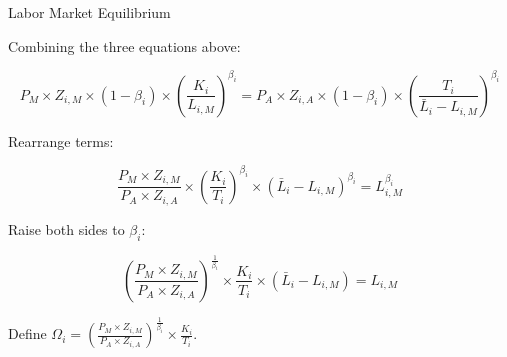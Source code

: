 \documentclass[notes,11pt, aspectratio=169, xcolor=table]{beamer}
\newenvironment{wideitemize}{\itemize\addtolength{\itemsep}{10pt}}{\enditemize}
\begin{document}
\begin{frame}{Labor Market Equilibrium}
    \begin{wideitemize}
        \item Combining the three equations above:

    { \scriptsize
    \begin{equation*}
        P_{M} \times  Z_{i,M} \times (1-\beta_i) \times \left( \frac{K_{i}}{L_{i,M}} \right)^{\beta_i} = P_{A} \times  Z_{i,A} \times (1-\beta_i) \times \left( \frac{T_{i}}{\bar{L}_i - L_{i,M}} \right)^{\beta_i} 
    \end{equation*}
    }
    \item<2-> Rearrange terms: 

        { \scriptsize
    \begin{equation*}
        \frac{P_{M} \times  Z_{i,M}}{P_{A} \times  Z_{i,A}} \times \left( \frac{K_{i}}{T_{i}} \right)^{\beta_i} \times (\bar{L}_i - L_{i,M})^{\beta_i} =  L_{i,M}^{\beta_i} 
    \end{equation*}
    }

    \item<3-> Raise both sides to $\beta_i$:

            { \scriptsize
    \begin{equation*}
         \left( \frac{P_{M} \times  Z_{i,M}}{P_{A} \times  Z_{i,A}} \right)^{\frac{1}{\beta_i}} \times  \frac{K_{i}}{T_{i}} \times (\bar{L}_i - L_{i,M}) =  L_{i,M} 
    \end{equation*}
    }    

    \item<4-> Define $\Omega_i = \left( \frac{P_{M} \times  Z_{i,M}}{P_{A} \times  Z_{i,A}} \right)^{\frac{1}{\beta_i}} \times  \frac{K_{i}}{T_{i}}$.


    \end{wideitemize}
\end{frame}
\end{document}
